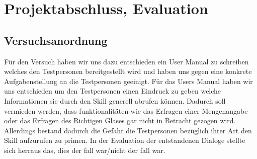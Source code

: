 \documentclass[12pt,letterpaper]{article}
\begin{document}
\section{Projektabschluss, Evaluation}
\subsection{Versuchsanordnung}
Für den Versuch haben wir uns dazu entschieden ein User Manual zu schreiben welches den Testpersonen
bereitgestellt wird und haben uns gegen eine konkrete Aufgabenstellung an die Testpersonen geeinigt. Für das Users Manual haben wir uns entschieden um den Testpersonen einen Eindruck zu geben welche Informationen sie durch den Skill generell abrufen können. Dadurch soll vermieden werden, dass funktionalitäten wie das Erfragen einer Mengenangabe oder das Erfragen des Richtigen Glases gar nicht in Betracht gezogen wird. Allerdings bestand dadurch die Gefahr die Testpersonen bezüglich ihrer Art den Skill aufzurufen zu primen.
In der Evaluation der entstandenen Dialoge stellte sich herraus das, dies der fall war/nicht der fall war.
\\
 
\end{document}
